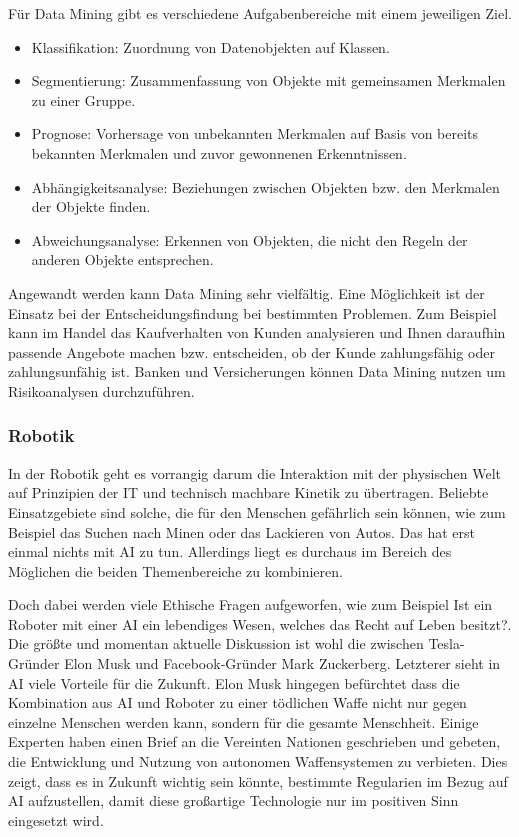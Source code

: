 Für Data Mining gibt es verschiedene Aufgabenbereiche mit einem jeweiligen Ziel.

\begin{itemize}
\item Klassifikation: Zuordnung von Datenobjekten auf Klassen.
\item Segmentierung: Zusammenfassung von Objekte mit gemeinsamen Merkmalen zu einer Gruppe.
\item Prognose: Vorhersage von unbekannten Merkmalen auf Basis von bereits bekannten Merkmalen und zuvor gewonnenen Erkenntnissen.
\item Abhängigkeitsanalyse: Beziehungen zwischen Objekten bzw. den Merkmalen der Objekte finden.
\item Abweichungsanalyse: Erkennen von Objekten, die nicht den Regeln der anderen Objekte entsprechen.
\end{itemize}

Angewandt werden kann Data Mining sehr vielfältig. Eine Möglichkeit ist der Einsatz bei der Entscheidungsfindung bei bestimmten Problemen. Zum Beispiel kann im Handel das Kaufverhalten von Kunden analysieren und Ihnen daraufhin passende Angebote machen bzw. entscheiden, ob der Kunde zahlungsfähig oder zahlungsunfähig ist. Banken und Versicherungen können Data Mining nutzen um Risikoanalysen durchzuführen. ~\cite{F_DataMining_3.3.5.2}

\subsubsection{Robotik}
In der Robotik geht es vorrangig darum die Interaktion mit der physischen Welt auf Prinzipien der IT und technisch machbare Kinetik zu übertragen. Beliebte Einsatzgebiete sind solche, die für den Menschen gefährlich sein können, wie zum Beispiel das Suchen nach Minen oder das Lackieren von Autos. Das hat erst einmal nichts mit AI zu tun. Allerdings liegt es durchaus im Bereich des Möglichen die beiden Themenbereiche zu kombinieren.

Doch dabei werden viele Ethische Fragen aufgeworfen, wie zum Beispiel \glqq Ist ein Roboter mit einer AI ein lebendiges Wesen, welches das Recht auf Leben besitzt?\grqq{}. Die größte und momentan aktuelle Diskussion ist wohl die zwischen Tesla-Gründer Elon Musk und Facebook-Gründer Mark Zuckerberg. Letzterer sieht in AI viele Vorteile für die Zukunft. Elon Musk hingegen befürchtet dass die Kombination aus AI und Roboter zu einer tödlichen Waffe nicht nur gegen einzelne Menschen werden kann, sondern für die gesamte Menschheit. Einige Experten haben einen Brief an die Vereinten Nationen geschrieben und gebeten, die Entwicklung und Nutzung von autonomen Waffensystemen zu verbieten. Dies zeigt, dass es in Zukunft wichtig sein könnte, bestimmte Regularien im Bezug auf AI aufzustellen, damit diese großartige Technologie nur im positiven Sinn eingesetzt wird. ~\cite{F_Robotik_3.3.5.3}
